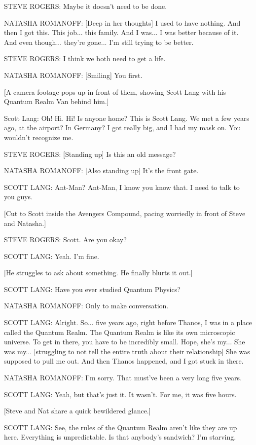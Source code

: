 STEVE ROGERS: Maybe it doesn't need to be done.

NATASHA ROMANOFF: [Deep in her thoughts] I used to have nothing. And then I got this. This job... this family. And I was... I was better because of it. And even though... they're gone... I'm still trying to be better.

STEVE ROGERS: I think we both need to get a life.

NATASHA ROMANOFF: [Smiling] You first.

[A camera footage pops up in front of them, showing Scott Lang with his Quantum Realm Van behind him.]

Scott Lang: Oh! Hi. Hi! Is anyone home? This is Scott Lang. We met a few years ago, at the airport? In Germany? I got really big, and I had my mask on. You wouldn't recognize me.

STEVE ROGERS: [Standing up] Is this an old message?

NATASHA ROMANOFF: [Also standing up] It's the front gate.

SCOTT LANG: Ant-Man? Ant-Man, I know you know that. I need to talk to you guys.

[Cut to Scott inside the Avengers Compound, pacing worriedly in front of Steve and Natasha.]

STEVE ROGERS: Scott. Are you okay?

SCOTT LANG: Yeah. I'm fine.

[He struggles to ask about something. He finally blurts it out.]

SCOTT LANG: Have you ever studied Quantum Physics?

NATASHA ROMANOFF: Only to make conversation.

SCOTT LANG: Alright. So... five years ago, right before Thanos, I was in a place called the Quantum Realm. The Quantum Realm is like its own microscopic universe. To get in there, you have to be incredibly small. Hope, she's my... She was my... [struggling to not tell the entire truth about their relationship] She was supposed to pull me out. And then Thanos happened, and I got stuck in there.

NATASHA ROMANOFF: I'm sorry. That must've been a very long five years.

SCOTT LANG: Yeah, but that's just it. It wasn't. For me, it was five hours.

[Steve and Nat share a quick bewildered glance.]

SCOTT LANG: See, the rules of the Quantum Realm aren't like they are up here. Everything is unpredictable. Is that anybody's sandwich? I'm starving.

